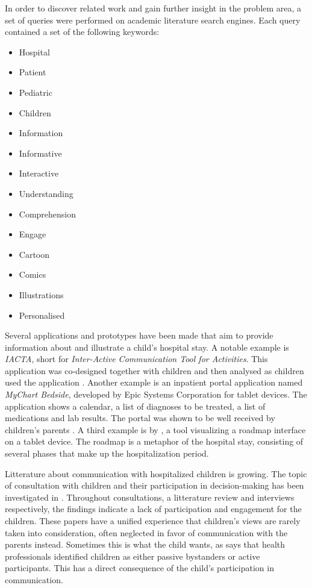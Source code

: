 In order to discover related work and gain further insight in the problem area, a set of queries were performed on academic literature search engines. Each query contained a set of the following keywords:

\begin{multicols}{3}
    \raggedcolumns
    \begin{itemize}
        \item Hospital
        \item Patient
        \item Pediatric
        \item Children
        \item Information
        \item Informative
        \item Interactive
        \item Understanding
        \item Comprehension
        \item Engage
        \item Cartoon
        \item Comics
        \item Illustrations
        \item Personalised
    \end{itemize}
\end{multicols}


Several applications and prototypes have been made that aim to provide information about and illustrate a child's hospital stay. A notable example is \emph{IACTA}, short for \emph{Inter-Active Communication Tool for Activities}. This application was co-designed together with children \parencite{stalberg2016} and then analysed as children used the application \parencite{stalberg2018}. Another example is an inpatient portal application named \emph{MyChart Bedside}, developed by Epic Systems Corporation for tablet devices. The application shows a calendar, a list of diagnoses to be treated, a list of medications and lab results. The portal was shown to be well received by children's parents \textcite{kelly2017}. A third example is by \textcite{maher2016}, a tool visualizing a roadmap interface on a tablet device. The roadmap is a metaphor of the hospital stay, consisting of several phases that make up the hospitalization period.

Litterature about communication with hospitalized children is growing. The topic of consultation with children and their participation in decision-making has been investigated in \textcite{coyne2006,coyne2008,coyne2011}. Throughout consultations, a litterature review and interviews respectively, the findings indicate a lack of participation and engagement for the children. These papers have a unified experience that children's views are rarely taken into consideration, often neglected in favor of communication with the parents instead. Sometimes this is what the child wants, as \textcite{lambert2011} says that health professionals identified children as either passive bystanders or active participants. This has a direct consequence of the child's participation in communication.

